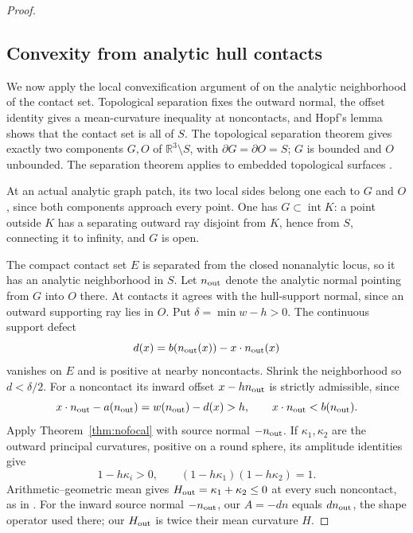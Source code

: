 \documentclass[11pt]{article}
\newcommand{\R}{\mathbb R}
\newcommand{\Int}{\operatorname{int}}
\begin{document}
\begin{proof}
\subsection{Convexity from analytic hull contacts}
We now apply the local convexification argument of \cite[Proposition 6.4, pp.~12--13]{GHL} on the analytic neighborhood of the contact set. Topological separation fixes the outward normal, the offset identity gives a mean-curvature inequality at noncontacts, and Hopf's lemma shows that the contact set is all of $S$.
The topological separation theorem gives exactly two components $G,O$ of $\R^3\setminus S$, with $\partial G=\partial O=S$; $G$ is bounded and $O$ unbounded. The separation theorem applies to embedded topological surfaces \cite[Corollary 3 and Theorem 4]{Lemmens}.

At an actual analytic graph patch, its two local sides belong one each to $G$ and $O$, since both components approach every point. One has $G\subset\Int K$: a point outside $K$ has a separating outward ray disjoint from $K$, hence from $S$, connecting it to infinity, and $G$ is open.

The compact contact set $E$ is separated from the closed nonanalytic locus, so it has an analytic neighborhood in $S$. Let $n_{\rm out}$ denote the analytic normal pointing from $G$ into $O$ there. At contacts it agrees with the hull-support normal, since an outward supporting ray lies in $O$. Put $\delta=\min w-h>0$. The continuous support defect
\[
 d(x)=b(n_{\rm out}(x))-x\cdot n_{\rm out}(x)
\]
vanishes on $E$ and is positive at nearby noncontacts. Shrink the neighborhood so $d<\delta/2$. For a noncontact its inward offset $x-hn_{\rm out}$ is strictly admissible, since
\[
 x\cdot n_{\rm out}-a(n_{\rm out})=w(n_{\rm out})-d(x)>h,
 \qquad x\cdot n_{\rm out}<b(n_{\rm out}).
\]
Apply Theorem~\ref{thm:nofocal} with source normal $-n_{\rm out}$. If $\kappa_1,\kappa_2$ are the outward principal curvatures, positive on a round sphere, its amplitude identities give
\[
 1-h\kappa_i>0,
 \qquad (1-h\kappa_1)(1-h\kappa_2)=1.
\]
Arithmetic--geometric mean gives $H_{\rm out}=\kappa_1+\kappa_2\le0$ at every such noncontact, as in \cite[Lemma 6.2, p.~12]{GHL}. For the inward source normal $-n_{\rm out}$, our $A=-dn$ equals $dn_{\rm out}$, the shape operator used there; our $H_{\rm out}$ is twice their mean curvature $H$.


\end{proof}
\end{document}
